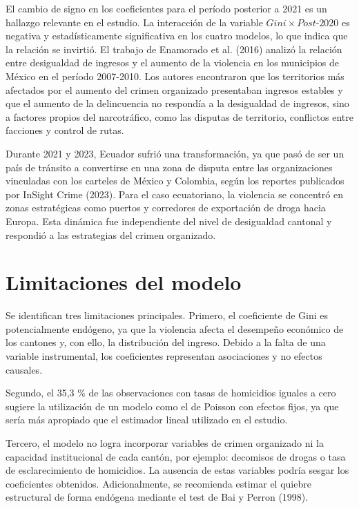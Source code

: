 \documentclass[12pt,a4paper]{article}
\begin{document}
El cambio de signo en los coeficientes para el período posterior a 2021 es un hallazgo relevante en el estudio. La interacción de la variable \(Gini \times Post\text{-}2020\) es negativa y estadísticamente significativa en los cuatro modelos, lo que indica que la relación se invirtió. El trabajo de Enamorado et al. (2016) analizó la relación entre desigualdad de ingresos y el aumento de la violencia en los municipios de México en el período 2007-2010. Los autores encontraron que los territorios más afectados por el aumento del crimen organizado presentaban ingresos estables y que el aumento de la delincuencia no respondía a la desigualdad de ingresos, sino a factores propios del narcotráfico, como las disputas de territorio, conflictos entre facciones y control de rutas.

Durante 2021 y 2023, Ecuador sufrió una transformación, ya que pasó de ser un país de tránsito a convertirse en una zona de disputa entre las organizaciones vinculadas con los carteles de México y Colombia, según los reportes publicados por InSight Crime (2023). Para el caso ecuatoriano, la violencia se concentró en zonas estratégicas como puertos y corredores de exportación de droga hacia Europa. Esta dinámica fue independiente del nivel de desigualdad cantonal y respondió a las estrategias del crimen organizado.

\section*{Limitaciones del modelo}

Se identifican tres limitaciones principales. Primero, el coeficiente de Gini es potencialmente endógeno, ya que la violencia afecta el desempeño económico de los cantones y, con ello, la distribución del ingreso. Debido a la falta de una variable instrumental, los coeficientes representan asociaciones y no efectos causales.

Segundo, el 35,3 \% de las observaciones con tasas de homicidios iguales a cero sugiere la utilización de un modelo como el de Poisson con efectos fijos, ya que sería más apropiado que el estimador lineal utilizado en el estudio.

Tercero, el modelo no logra incorporar variables de crimen organizado ni la capacidad institucional de cada cantón, por ejemplo: decomisos de drogas o tasa de esclarecimiento de homicidios. La ausencia de estas variables podría sesgar los coeficientes obtenidos. Adicionalmente, se recomienda estimar el quiebre estructural de forma endógena mediante el test de Bai y Perron (1998).
\end{document}
